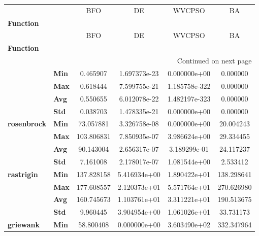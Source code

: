 \begin{longtable}{llcccc}
\toprule
            &     &          BFO &            DE &         WVCPSO &           BA \\
\textbf{Function} & {} &              &               &                &              \\
\midrule
\endfirsthead

\toprule
            &     &          BFO &            DE &         WVCPSO &           BA \\
\textbf{Function} & {} &              &               &                &              \\
\midrule
\endhead
\midrule
\multicolumn{6}{r}{{Continued on next page}} \\
\midrule
\endfoot

\bottomrule
\endlastfoot
\multirow{4}{*}{\textbf{sphere}} & \textbf{Min} &     0.465907 &  1.697373e-23 &   0.000000e+00 &     0.000000 \\
            & \textbf{Max} &     0.618444 &  7.599755e-21 &  1.185758e-322 &     0.000000 \\
            & \textbf{Avg} &     0.550655 &  6.012078e-22 &  1.482197e-323 &     0.000000 \\
            & \textbf{Std} &     0.038703 &  1.478335e-21 &   0.000000e+00 &     0.000000 \\
\cline{1-6}
\multirow{4}{*}{\textbf{rosenbrock}} & \textbf{Min} &    73.057881 &  3.326758e-08 &   0.000000e+00 &    20.004243 \\
            & \textbf{Max} &   103.806831 &  7.850935e-07 &   3.986624e+00 &    29.334455 \\
            & \textbf{Avg} &    90.143004 &  2.656317e-07 &   3.189299e-01 &    24.117237 \\
            & \textbf{Std} &     7.161008 &  2.178017e-07 &   1.081544e+00 &     2.533412 \\
\cline{1-6}
\multirow{4}{*}{\textbf{rastrigin}} & \textbf{Min} &   137.828158 &  5.416934e+00 &   1.890422e+01 &   138.298641 \\
            & \textbf{Max} &   177.608557 &  2.120373e+01 &   5.571764e+01 &   270.626980 \\
            & \textbf{Avg} &   160.745673 &  1.103761e+01 &   3.311221e+01 &   190.513675 \\
            & \textbf{Std} &     9.960445 &  3.904954e+00 &   1.061026e+01 &    33.731173 \\
\cline{1-6}
\multirow{4}{*}{\textbf{griewank}} & \textbf{Min} &    58.800408 &  0.000000e+00 &   3.603490e+02 &   332.347964 \\

\end{longtable}
